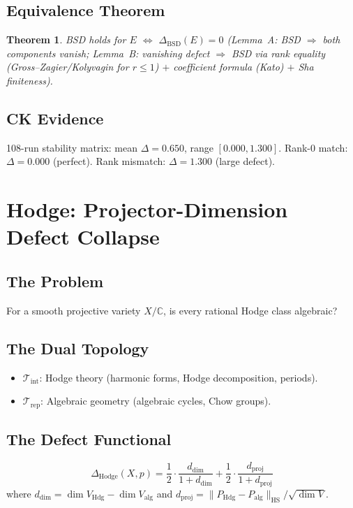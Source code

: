 \documentclass[12pt, openany]{book}
\newtheorem{theorem}{Theorem}[chapter]
\theoremstyle{remark}
\newcommand{\C}{\mathbb{C}}
\newcommand{\Tint}{\mathcal{T}_{\mathrm{int}}}
\newcommand{\Trep}{\mathcal{T}_{\mathrm{rep}}}
\DeclareMathOperator{\Hdg}{Hdg}
\begin{document}
\subsection{Equivalence Theorem}
\begin{theorem}
BSD holds for $E$ $\Longleftrightarrow$ $\Delta_{\mathrm{BSD}}(E) = 0$
(Lemma~A: BSD $\Rightarrow$ both components vanish;
Lemma~B: vanishing defect $\Rightarrow$ BSD via rank equality (Gross--Zagier/Kolyvagin
for $r \leq 1$) $+$ coefficient formula (Kato) $+$ Sha finiteness).
\end{theorem}

\subsection{CK Evidence}
108-run stability matrix: mean $\Delta = 0.650$, range $[0.000, 1.300]$.
Rank-0 match: $\Delta = 0.000$ (perfect). Rank mismatch: $\Delta = 1.300$ (large defect).


\section{Hodge: Projector-Dimension Defect Collapse}
\label{sec:hodge}

\subsection{The Problem}
For a smooth projective variety $X/\C$, is every rational Hodge class algebraic?

\subsection{The Dual Topology}
\begin{itemize}
  \item $\Tint$: Hodge theory (harmonic forms, Hodge decomposition, periods).
  \item $\Trep$: Algebraic geometry (algebraic cycles, Chow groups).
\end{itemize}

\subsection{The Defect Functional}
\[
  \boxed{\Delta_{\mathrm{Hodge}}(X, p) = \frac{1}{2} \cdot \frac{d_{\mathrm{dim}}}{1 + d_{\mathrm{dim}}} + \frac{1}{2} \cdot \frac{d_{\mathrm{proj}}}{1 + d_{\mathrm{proj}}}}
\]
where $d_{\mathrm{dim}} = \dim V_{\Hdg} - \dim V_{\mathrm{alg}}$ and
$d_{\mathrm{proj}} = \|P_{\Hdg} - P_{\mathrm{alg}}\|_{\mathrm{HS}} / \sqrt{\dim V}$.
\end{document}
